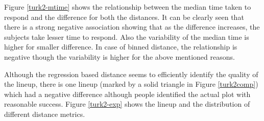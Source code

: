 \documentclass[12]{article}
\begin{document}
Figure \ref{turk2-mtime} shows the relationship between the median time taken to respond and the difference for both the distances. It can be clearly seen that there is a strong negative association showing that as the difference increases, the subjects take lesser time to respond. Also the variability of the median time is higher for smaller difference. In case of binned distance, the relationship is negative though the variability is higher for the above mentioned reasons.

Although the regression based distance seems to efficiently identify the quality of the lineup, there is one lineup (marked by a solid triangle in Figure \ref{turk2comp}) which had a negative difference although people identified the actual plot with reasonable success.  Figure \ref{turk2-exp} shows the lineup and the distribution of different distance metrics.  
\end{document}
